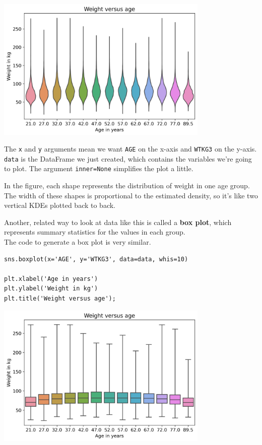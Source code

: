 \begin{center}
\includegraphics[width=4in]{chapters/09_relationships_files/09_relationships_42_0.png}
\end{center}

The \passthrough{\lstinline!x!} and \passthrough{\lstinline!y!}
arguments mean we want \passthrough{\lstinline!AGE!} on the x-axis and
\passthrough{\lstinline!WTKG3!} on the y-axis.
\passthrough{\lstinline!data!} is the DataFrame we just created, which
contains the variables we're going to plot. The argument
\passthrough{\lstinline!inner=None!} simplifies the plot a little.

In the figure, each shape represents the distribution of weight in one
age group. The width of these shapes is proportional to the estimated
density, so it's like two vertical KDEs plotted back to back.

Another, related way to look at data like this is called a \textbf{box
plot}, which represents summary statistics for the values in each
group.\\
The code to generate a box plot is very similar.

\begin{lstlisting}[]
sns.boxplot(x='AGE', y='WTKG3', data=data, whis=10)

plt.xlabel('Age in years')
plt.ylabel('Weight in kg')
plt.title('Weight versus age');
\end{lstlisting}

\begin{center}
\includegraphics[width=4in]{chapters/09_relationships_files/09_relationships_44_0.png}
\end{center}

